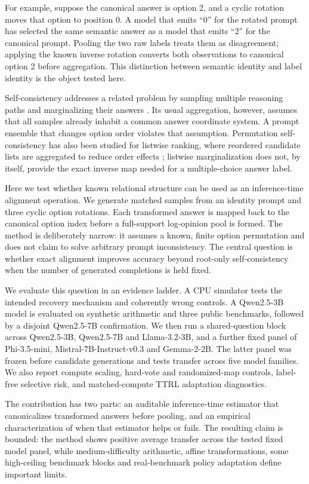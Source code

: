 \documentclass[11pt]{article}
\begin{document}
For example, suppose the canonical answer is option 2, and a cyclic rotation moves that option to position 0. A model that emits ``0'' for the rotated prompt has selected the same semantic answer as a model that emits ``2'' for the canonical prompt. Pooling the two raw labels treats them as disagreement; applying the known inverse rotation converts both observations to canonical option 2 before aggregation. This distinction between semantic identity and label identity is the object tested here.

Self-consistency addresses a related problem by sampling multiple reasoning paths and marginalizing their answers \citep{wang2023selfconsistency}. Its usual aggregation, however, assumes that all samples already inhabit a common answer coordinate system. A prompt ensemble that changes option order violates that assumption. Permutation self-consistency has also been studied for listwise ranking, where reordered candidate lists are aggregated to reduce order effects \citep{tang2024middle}; listwise marginalization does not, by itself, provide the exact inverse map needed for a multiple-choice answer label.

Here we test whether known relational structure can be used as an inference-time alignment operation. We generate matched samples from an identity prompt and three cyclic option rotations. Each transformed answer is mapped back to the canonical option index before a full-support log-opinion pool is formed. The method is deliberately narrow: it assumes a known, finite option permutation and does not claim to solve arbitrary prompt inconsistency. The central question is whether exact alignment improves accuracy beyond root-only self-consistency when the number of generated completions is held fixed.

We evaluate this question in an evidence ladder. A CPU simulator tests the intended recovery mechanism and coherently wrong controls. A Qwen2.5-3B model is evaluated on synthetic arithmetic and three public benchmarks, followed by a disjoint Qwen2.5-7B confirmation. We then run a shared-question block across Qwen2.5-3B, Qwen2.5-7B and Llama-3.2-3B, and a further fixed panel of Phi-3.5-mini, Mistral-7B-Instruct-v0.3 and Gemma-2-2B. The latter panel was frozen before candidate generations and tests transfer across five model families. We also report compute scaling, hard-vote and randomized-map controls, label-free selective risk, and matched-compute TTRL adaptation diagnostics.

The contribution has two parts: an auditable inference-time estimator that canonicalizes transformed answers before pooling, and an empirical characterization of when that estimator helps or fails. The resulting claim is bounded: the method shows positive average transfer across the tested fixed model panel, while medium-difficulty arithmetic, affine transformations, some high-ceiling benchmark blocks and real-benchmark policy adaptation define important limits.
\end{document}
